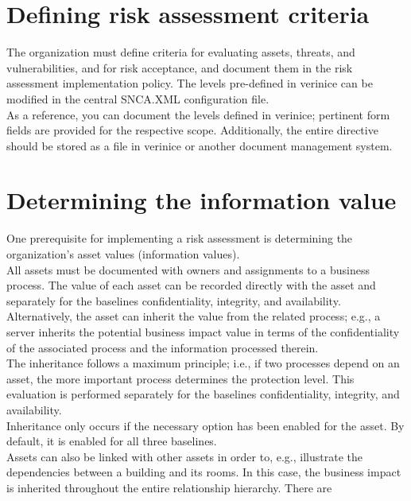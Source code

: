 \documentclass[a4paper,10pt]{book}
\begin{document}
\section{Defining risk assessment criteria}
The organization must define criteria for evaluating assets, threats, and vulnerabilities, and for risk acceptance,
and document them in the risk assessment implementation policy. The levels pre-defined in verinice can be modified
in the central SNCA.XML configuration file.
\newline\\
As a reference, you can document the levels defined in verinice; pertinent form fields are provided for the respective
scope. Additionally, the entire directive should be stored as a file in verinice or another document management system.

\section{Determining the information value}
One prerequisite for implementing a risk assessment is determining the organization's asset values (information values).
\newline\\
All assets must be documented with owners and assignments to a business process. The value of each asset can be
recorded directly with the asset and separately for the baselines confidentiality, integrity, and availability.
Alternatively, the asset can inherit the value from the related process; e.g., a server inherits the potential
business impact value in terms of the confidentiality of the associated process and the information processed therein.
\newline\\
The inheritance follows a maximum principle; i.e., if two processes depend on an asset, the more important process
determines the protection level. This evaluation is performed separately for the baselines confidentiality,
integrity, and availability.
\newline\\
Inheritance only occurs if the necessary option has been enabled for the asset. By default, it is enabled for all
three baselines.
\newline\\
Assets can also be linked with other assets in order to, e.g., illustrate the dependencies between a building and
its rooms. In this case, the business impact is inherited throughout the entire relationship hierarchy. There are
\end{document}
